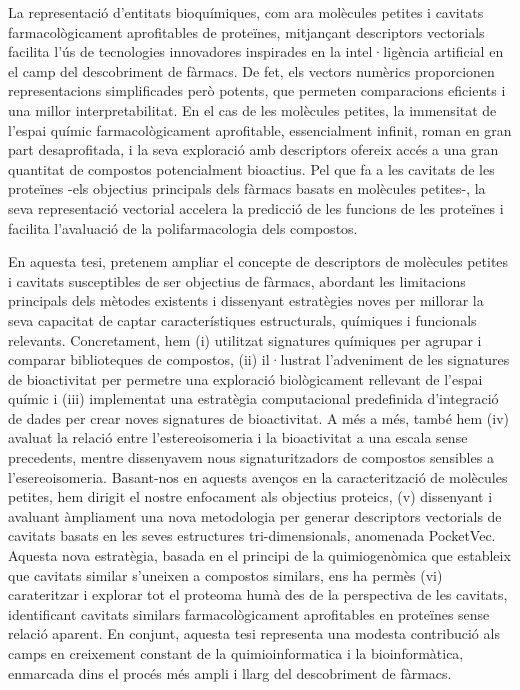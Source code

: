 
La representació d'entitats bioquímiques, com ara molècules petites i cavitats farmacològicament aprofitables de proteïnes, mitjançant descriptors vectorials facilita l'ús de tecnologies innovadores inspirades en la intel·ligència artificial en el camp del descobriment de fàrmacs. De fet, els vectors numèrics proporcionen representacions simplificades però potents, que permeten comparacions eficients i una millor interpretabilitat. En el cas de les molècules petites, la immensitat de l'espai químic farmacològicament aprofitable, essencialment infinit, roman en gran part desaprofitada, i la seva exploració amb descriptors ofereix accés a una gran quantitat de compostos potencialment bioactius. Pel que fa a les cavitats de les proteïnes -els objectius principals dels fàrmacs basats en molècules petites-, la seva representació vectorial accelera la predicció de les funcions de les proteïnes i facilita l'avaluació de la polifarmacologia dels compostos. 

En aquesta tesi, pretenem ampliar el concepte de descriptors de molècules petites i cavitats susceptibles de ser objectius de fàrmacs, abordant les limitacions principals dels mètodes existents i dissenyant estratègies noves per millorar la seva capacitat de captar característiques estructurals, químiques i funcionals relevants. Concretament, hem (i) utilitzat signatures químiques per agrupar i comparar biblioteques de compostos, (ii) il·lustrat l'adveniment de les signatures de bioactivitat per permetre una exploració biològicament rellevant de l'espai químic i (iii) implementat una estratègia computacional predefinida d'integració de dades per crear noves signatures de bioactivitat. A més a més, també hem (iv) avaluat la relació entre l'estereoisomeria i la bioactivitat a una escala sense precedents, mentre dissenyavem nous signaturitzadors de compostos sensibles a l'esereoisomeria. Basant-nos en aquests avenços en la caracterització de molècules petites, hem dirigit el nostre enfocament als objectius proteics, (v) dissenyant i avaluant àmpliament una nova metodologia per generar descriptors vectorials de cavitats basats en les seves estructures tri-dimensionals, anomenada PocketVec. Aquesta nova estratègia, basada en el principi de la quimiogenòmica que estableix que cavitats similar s'uneixen a compostos similars, ens ha permès (vi) carateritzar i explorar tot el proteoma humà des de la perspectiva de les cavitats, identificant cavitats similars farmacològicament aprofitables en proteïnes sense relació aparent. En conjunt, aquesta tesi representa una modesta contribució als camps en creixement constant de la quimioinformatica i la bioinformàtica, enmarcada dins el procés més ampli i llarg del descobriment de fàrmacs.